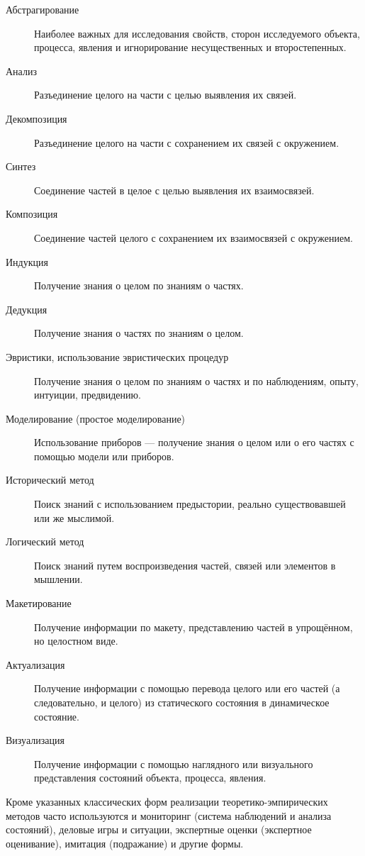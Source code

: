 \begin{description}
    \item [Абстрагирование]
          Наиболее важных для исследования свойств, сторон исследуемого объекта, процесса, явления и игнорирование несущественных и второстепенных.
    \item [Анализ]
          Разъединение целого на части с целью выявления их связей.
    \item [Декомпозиция]
          Разъединение целого на части с сохранением их связей с окружением.
    \item [Синтез]
          Соединение частей в целое с целью выявления их взаимосвязей.
    \item [Композиция]
          Соединение частей целого с сохранением их взаимосвязей с окружением.
    \item [Индукция]
          Получение знания о целом по знаниям о частях.
    \item [Дедукция]
          Получение знания о частях по знаниям о целом.
    \item [Эвристики, использование эвристических процедур]
          Получение знания о целом по знаниям о частях и по наблюдениям, опыту, интуиции, предвидению.
    \item [Моделирование (простое моделирование)]
          Использование приборов --- получение знания о целом или о его частях с помощью модели или приборов.
    \item [Исторический метод]
          Поиск знаний с использованием предыстории, реально существовавшей или же мыслимой.
    \item [Логический метод]
          Поиск знаний путем воспроизведения частей, связей или элементов в мышлении.
    \item [Макетирование]
          Получение информации по макету, представлению частей в упрощённом, но целостном виде.
    \item [Актуализация]
          Получение информации с помощью перевода целого или его частей (а следовательно, и целого) из статического состояния в динамическое состояние.
    \item [Визуализация]
          Получение информации с помощью наглядного или визуального представления состояний объекта, процесса, явления.
\end{description}

Кроме указанных классических форм реализации теоретико-эмпирических методов часто используются и мониторинг (система наблюдений и анализа состояний), деловые игры и ситуации, экспертные оценки (экспертное оценивание), имитация (подражание) и другие формы.


